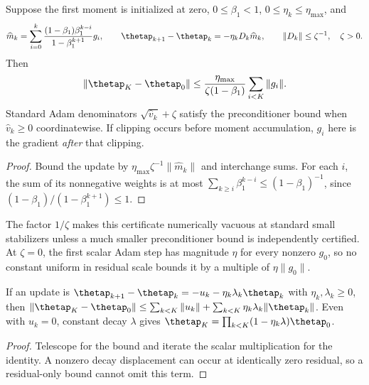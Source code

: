 \begin{lemma}
\label{lem:astra_adam}
Suppose the first moment is initialized at zero, $0\le\beta_1<1$,
$0\le\eta_k\le\eta_{\max}$, and
\[
 \widehat m_k=\sum_{i=0}^k
 \frac{(1-\beta_1)\beta_1^{k-i}}{1-\beta_1^{k+1}}g_i,
 \qquad \thetap_{k+1}-\thetap_k=-\eta_kD_k\widehat m_k,
 \qquad \|D_k\|\le\zeta^{-1},\quad\zeta>0.
\]
Then
\begin{equation}\label{eq:astra_adam}
 \|\thetap_K-\thetap_0\|
 \le\frac{\eta_{\max}}{\zeta(1-\beta_1)}\sum_{i<K}\|g_i\|.
\end{equation}
Standard Adam denominators $\sqrt{\widehat v_k}+\zeta$ satisfy the
preconditioner bound when $\widehat v_k\ge0$ coordinatewise. If
clipping occurs before moment accumulation, $g_i$ here is the gradient
\emph{after} that clipping.
\end{lemma}
\begin{proof}
Bound the update by $\eta_{\max}\zeta^{-1}\|\widehat m_k\|$ and
interchange sums. For each $i$, the sum of its nonnegative weights is
at most $\sum_{k\ge i}\beta_1^{k-i}\le(1-\beta_1)^{-1}$, since
$(1-\beta_1)/(1-\beta_1^{k+1})\le1$.
\end{proof}
\begin{remark}
The factor $1/\zeta$ makes this certificate numerically vacuous at
standard small stabilizers unless a much smaller preconditioner bound
is independently certified. At $\zeta=0$, the first scalar Adam step
has magnitude $\eta$ for every nonzero $g_0$, so no constant uniform
in residual scale bounds it by a multiple of $\eta\|g_0\|$.
\end{remark}

\begin{lemma}
\label{lem:astra_decay}
If an update is $\thetap_{k+1}-\thetap_k=-u_k-\eta_k\lambda_k\thetap_k$
with $\eta_k,\lambda_k\ge0$, then
$\|\thetap_K-\thetap_0\|\le\sum_{k<K}\|u_k\|+
\sum_{k<K}\eta_k\lambda_k\|\thetap_k\|$.
Even with $u_k=0$, constant decay $\lambda$ gives
$\thetap_K=\prod_{k<K}(1-\eta_k\lambda)\thetap_0$.
\end{lemma}
\begin{proof}
Telescope for the bound and iterate the scalar multiplication for the
identity. A nonzero decay displacement can occur at identically zero
residual, so a residual-only bound cannot omit this term.
\end{proof}

